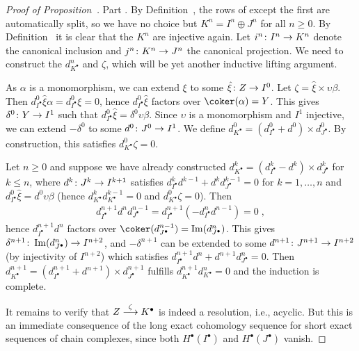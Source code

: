 \documentclass[a4paper,parskip=half,numbers=enddot, DIV=12]{scrreprt}
\begin{document}
\begin{proof}[Proof of Proposition~]
	Part . By Definition~, the rows of  except the first are automatically split, so we have no choice but $K^n=I^n\oplus J^n$ for all $n\geq 0$. By Definition~ it is clear that the $K^n$ are injective again. Let $i^n\colon I^n\morphism K^n$ denote the canonical inclusion and $j^n\colon K^n\morphism J^n$ the canonical projection. We need to construct the $d_{K^\bullet }^n$ and $\zeta$, which will be yet another inductive lifting argument.
	 
	 As $\alpha$ is a monomorphism, we can extend $\xi$ to some $\hat{\xi}\colon Z\morphism I^0$. Let $\zeta=\hat{\xi}\times \upsilon\beta$. Then $d_{I^\bullet }^0\hat{\xi}\alpha=d_{I^\bullet }^0\xi=0$, hence $d_{I^\bullet }^0\hat{\xi}$ factors over $\coker(\alpha)=Y$. This gives $\delta^0\colon Y\morphism I^1$ such that $d_{I^\bullet }^0\hat{\xi}=\delta^0\upsilon\beta$. Since $\upsilon$ is a monomorphism and $I^1$ injective, we can extend $-\delta^0$ to some $d^0\colon J^0\morphism I^1$. We define $d_{K^\bullet }^0=(d_{I^\bullet }^0+d^0)\times d_{J^\bullet }^0$. By construction, this satisfies $d_{K^\bullet }^0\zeta=0$.
	 
	 Let $n\geq 0$ and suppose we have already constructed $d_{K^\bullet }^k=(d_{I^\bullet }^k-d^k)\times d_{J^\bullet }^k$ for $k\leq n$, where $d^k\colon J^k\morphism I^{k+1}$ satisfies $d_{I^\bullet }^kd^{k-1}+d^kd_{J^\bullet }^{k-1}=0$ for $k=1,\ldots,n$ and $d_{I^\bullet }^0\hat{\xi}=d^0\upsilon\beta$ (hence $d_{K^\bullet }^kd_{K^\bullet }^{k-1}=0$ and $d_{K^\bullet }^0\zeta=0$). Then
	 \begin{align*}
	 	d_{I^\bullet }^{n+1}d^nd_{J^\bullet }^{n-1}=d_{I^\bullet }^{n+1}\left(-d_{I^\bullet }^nd^{n-1}\right)=0\;,
	 \end{align*}
	 hence $d_{I^\bullet }^{n+1}d^n$ factors over $\coker(d_{J^\bullet }^{n-1})=\Im(d_{J^\bullet }^n)$. This gives $\delta^{n+1}\colon \Im(d_{J^\bullet }^n)\morphism I^{n+2}$, and $-\delta^{n+1}$ can be extended to some $d^{n+1}\colon J^{n+1}\morphism I^{n+2}$ (by injectivity of $I^{n+2}$) which satisfies $d_{I^\bullet }^{n+1}d^{n}+d^{n+1}d_{J^\bullet }^n=0$. Then $d_{K^\bullet }^{n+1}=(d_{I^\bullet }^{n+1}+d^{n+1})\times d_{J^\bullet }^{n+1}$ fulfills $d_{K^\bullet }^{n+1}d_{K^\bullet }^n=0$ and the induction is complete.
	
	 It remains to verify that $Z\morphism[\zeta]K^\bullet $ is indeed a resolution, i.e., acyclic. But this is an immediate consequence of the long exact cohomology sequence for short exact sequences of chain complexes, since both $H^\bullet (I^\bullet )$ and $H^\bullet (J^\bullet )$ vanish.
\end{proof}
\end{document}
